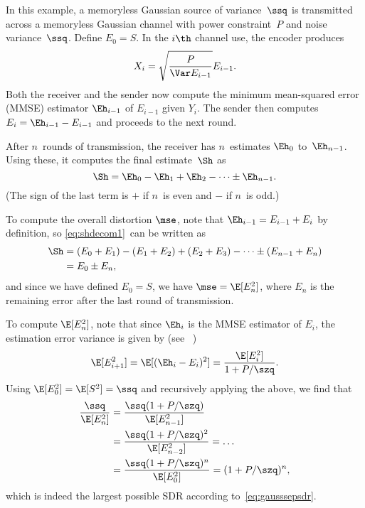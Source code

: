 \begin{example}
  \label{ex:gaussfb}
  In this example, a memoryless Gaussian source of variance~$\ssq$ is
  transmitted across a memoryless Gaussian channel with power constraint~$P$ and
  noise variance~$\ssq$.  Define $E_0 = S$. In the $i\th$ channel use, the
  encoder produces
  \begin{equation}
    \label{eq:gaussfbxi}
    X_i = \sqrt{\frac{P}{\Var E_{i-1}}} E_{i-1}.
  \end{equation}
  Both the receiver and the sender now compute the minimum mean-squared
  error (MMSE) estimator $\Eh_{i-1}$ of $E_{i-1}$ given $Y_i$. The sender then
  computes $E_i = \Eh_{i-1} - E_{i-1}$ and proceeds to the next round.

  After $n$~rounds of transmission, the receiver has $n$~estimates $\Eh_0$
  to~$\Eh_{n-1}$. Using these, it computes the final estimate~$\Sh$ as
  \begin{equation}
    \label{eq:shdecom1}
    \Sh = \Eh_0 - \Eh_1 + \Eh_2 - \cdots \pm \Eh_{n-1}.
  \end{equation}
  (The sign of the last term is $+$ if $n$~is even and $-$ if $n$~is odd.)

  To compute the overall distortion $\mse$, note that $\Eh_{i-1} = E_{i-1} +
  E_i$ by definition, so \eqref{eq:shdecom1}~can be written as
  \begin{align*}
    \Sh &= (E_0 + E_1) - (E_1 + E_2) + (E_2 + E_3) - \cdots \pm (E_{n-1} + E_n)
    \\
    &= E_0 \pm E_n,
  \end{align*}
  and since we have defined $E_0 = S$, we have $\mse = \E[E_n^2]$, where $E_n$
  is the remaining error after the last round of transmission.

  To compute $\E[E_n^2]$, note that since $\Eh_i$ is the MMSE estimator of
  $E_i$, the estimation error variance is given by (see
  \eg~\cite[Section~8.3]{Scharf1990})
  \begin{equation}
    \label{eq:gaussvardec}
    \E[E_{i+1}^2] = \E[(\Eh_i - E_i)^2] = \frac{\E[E_i^2]}{1 + P/\szq}.
  \end{equation}
  Using $\E[E_0^2] = \E[S^2] = \ssq$ and recursively applying the above, we find
  that
  \begin{align*}
    \frac{\ssq}{\E[E_n^2]} &= \frac{\ssq (1 + P/\szq)}{\E[E_{n-1}^2]} \\
    &= \frac{\ssq(1 + P/\szq)^2}{\E[E_{n-2}^2]} = \dots \\
    &= \frac{\ssq(1 + P/\szq)^n}{\E[E_0^2]} = (1 + P/\szq)^n,
  \end{align*}
  which is indeed the largest possible SDR according to~\eqref{eq:gausssepsdr}.
\end{example}

